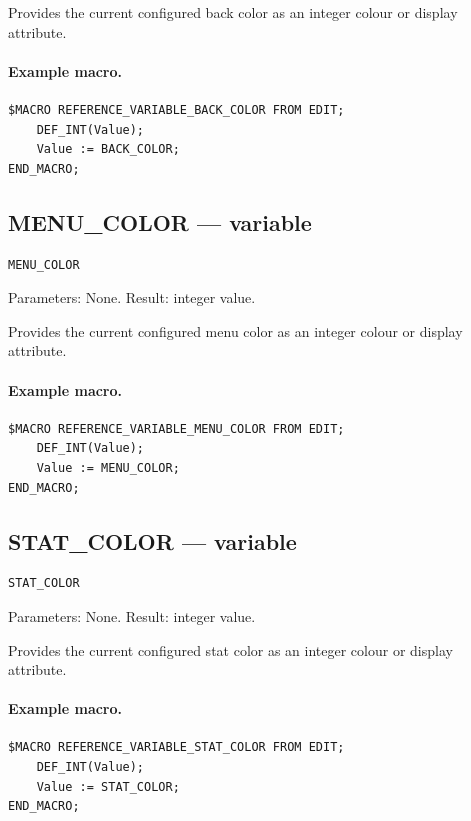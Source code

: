 \documentclass[a4paper,10pt,twoside,openany]{book}
\begin{document}
Provides the current configured back color as an integer colour or display attribute.

\paragraph{Example macro.}
\begin{verbatim}
$MACRO REFERENCE_VARIABLE_BACK_COLOR FROM EDIT;
    DEF_INT(Value);
    Value := BACK_COLOR;
END_MACRO;
\end{verbatim}

\label{prim:variable-menu-color}
\subsection*{MENU\_COLOR --- variable}
\begin{verbatim}
MENU_COLOR
\end{verbatim}
Parameters: None. Result: integer value.

Provides the current configured menu color as an integer colour or display attribute.

\paragraph{Example macro.}
\begin{verbatim}
$MACRO REFERENCE_VARIABLE_MENU_COLOR FROM EDIT;
    DEF_INT(Value);
    Value := MENU_COLOR;
END_MACRO;
\end{verbatim}

\label{prim:variable-stat-color}
\subsection*{STAT\_COLOR --- variable}
\begin{verbatim}
STAT_COLOR
\end{verbatim}
Parameters: None. Result: integer value.

Provides the current configured stat color as an integer colour or display attribute.

\paragraph{Example macro.}
\begin{verbatim}
$MACRO REFERENCE_VARIABLE_STAT_COLOR FROM EDIT;
    DEF_INT(Value);
    Value := STAT_COLOR;
END_MACRO;
\end{verbatim}
\end{document}
